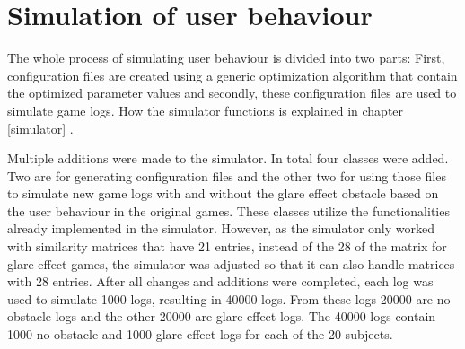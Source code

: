 \newpage

\section{Simulation of user behaviour}
\label{simulatoin_of_user_behaviour}
The whole process of simulating user behaviour is divided into two parts: First, configuration files are created using a generic optimization algorithm that contain the optimized parameter values and secondly, these configuration files are used to simulate game logs. How the simulator functions is explained in chapter \ref{simulator} .

Multiple additions were made to the simulator. In total four classes were added. Two are for generating configuration files %
and the other two for using those files to simulate new game logs with and without the glare effect obstacle based on the user behaviour in the original games.  %
These classes utilize the functionalities already implemented in the simulator. However, as the simulator only worked with similarity matrices that have 21 entries, instead of the 28 of the matrix for glare effect games, the simulator was adjusted so that it can also handle matrices with 28 entries. After all changes and additions were completed, each log was used to simulate 1000 logs, resulting in 40000 logs. From these logs 20000 are no obstacle logs and the other 20000 are glare effect logs. The 40000 logs contain 1000 no obstacle and 1000 glare effect logs for each of the 20 subjects.  



